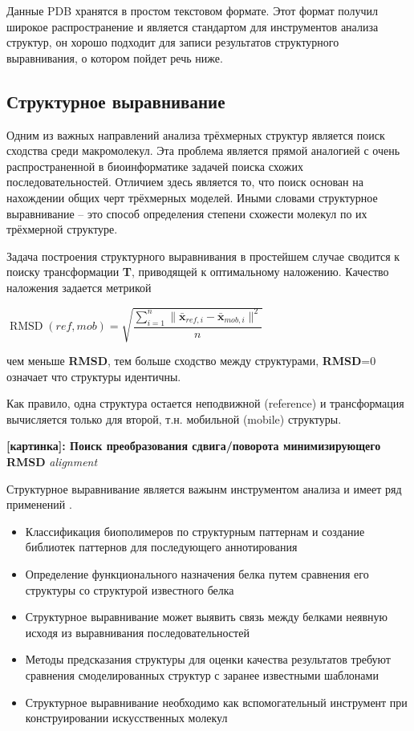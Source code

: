 \documentclass[a4paper, 12pt, titlepage, utf8]{extarticle}
\newcommand{\myimage}[2]{   
    \begin{center} \textbf{[картинка]: #1} \textit{#2} \end{center} 
}
\begin{document}
Данные PDB хранятся в простом текстовом формате. Этот формат получил широкое распространение и является стандартом для инструментов анализа структур, он хорошо подходит для записи результатов структурного выравнивания, о котором пойдет речь ниже.

\subsection{Структурное выравнивание}
Одним из важных направлений анализа трёхмерных структур является поиск сходства среди макромолекул. Эта проблема является прямой аналогией с очень распространенной в биоинформатике задачей поиска схожих последовательностей. Отличием здесь является то, что поиск основан на нахождении общих черт трёхмерных моделей. Иными словами структурное выравнивание -- это способ определения степени схожести молекул по их трёхмерной структуре.

Задача построения структурного выравнивания в простейшем случае сводится к поиску трансформации \textbf{T}, приводящей к оптимальному наложению. Качество наложения задается метрикой 
\begin{center} $ \operatorname{RMSD}(ref, mob) = \sqrt{ \dfrac{\sum_{i=1}^n \| \mathbf{\bar{x}}_{ref,i} -  \mathbf{\bar{x}}_{mob,i} \| ^2} {n} } $ \end{center}
чем меньше \textbf{RMSD}, тем больше сходство между структурами,  \textbf{RMSD}=0  означает что структуры идентичны.

Как правило, одна структура остается неподвижной (reference) и трансформация вычисляется только для второй, т.н. мобильной (mobile) структуры.

\myimage{Поиск преобразования сдвига/поворота минимизирующего RMSD}{alignment}

Структурное выравнивание является важынм инструментом анализа и имеет ряд применений \cite{structural-bionformatics}.
\begin{itemize}
    \item Классификация биополимеров по структурным паттернам и создание библиотек паттернов для последующего аннотирования
    \item Определение функционального назначения белка путем сравнения его структуры со структурой известного белка
    \item Структурное выравнивание может выявить связь между белками неявную исходя из выравнивания последовательностей 
    \item Методы предсказания структуры для оценки качества результатов требуют сравнения смоделированных структур с заранее известными шаблонами
    \item Структурное выравнивание необходимо как вспомогательный инструмент при конструировании искусственных молекул
\end{itemize}
\end{document}
